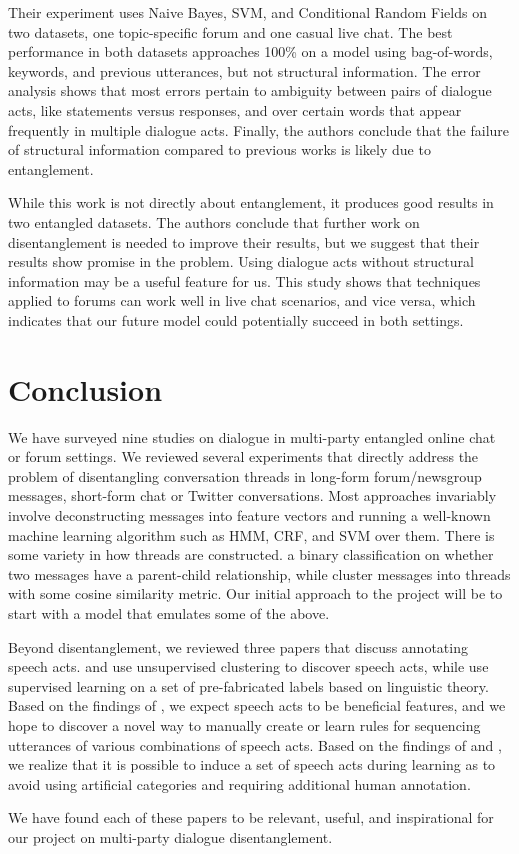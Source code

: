 \documentclass[11pt]{article}
\begin{document}
Their experiment uses Naive Bayes, SVM, and Conditional Random Fields on two
datasets, one topic-specific forum and one casual live chat. The best
performance in both datasets approaches 100\% on a model using bag-of-words,
keywords, and previous utterances, but not structural information. The error
analysis shows that most errors pertain to ambiguity between pairs of dialogue
acts, like statements versus responses, and over certain words that appear
frequently in multiple dialogue acts. Finally, the authors conclude that the
failure of structural information compared to previous works is likely due to
entanglement.

While this work is not directly about entanglement, it produces good results in
two entangled datasets. The authors conclude that further work on
disentanglement is needed to improve their results, but we suggest that their
results show promise in the problem. Using
dialogue acts without structural information may be a useful feature
for us. This study shows that techniques applied to forums can work well
in live chat scenarios, and vice versa, which indicates that our future model
could potentially succeed in both settings.

\section{Conclusion}

We have surveyed nine studies on dialogue in multi-party entangled online 
chat or forum settings. We reviewed several experiments that directly address
the problem of disentangling conversation threads in long-form forum/newsgroup messages,
short-form chat or Twitter conversations. Most approaches
invariably involve deconstructing messages into feature vectors and running a 
well-known machine learning algorithm such as HMM, CRF, and SVM over them.
There is some variety in how threads are constructed. \cite{Aumayr2011a}
a binary classification on whether two messages have a parent-child
relationship, while \cite{Mayfield2012a} cluster messages into threads with 
some cosine similarity metric. Our initial approach to the project will be to 
start with a model that emulates some of the above.

Beyond disentanglement, we reviewed three papers that discuss annotating 
speech acts. \cite{Ritter2010a} and \cite{Paula} use unsupervised clustering 
to discover speech acts, while \cite{Kim2012} use supervised learning on a set 
of pre-fabricated labels based on linguistic theory. Based on the findings of 
\cite{Kim2012}, we expect speech acts to be beneficial features, and we hope 
to discover a novel way to manually create or learn rules for sequencing 
utterances of various combinations of speech acts. Based on the findings of
\cite{Ritter2010a} and \cite{Paula}, we realize that it is possible to induce 
a set of speech acts during learning as to avoid using artificial categories 
and requiring additional human annotation.

We have found each of these papers to be relevant, useful, and inspirational
for our project on multi-party dialogue disentanglement.

{} 
\end{document}
